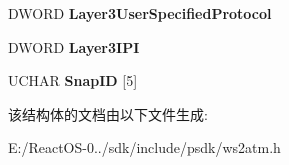 \begin{DoxyCompactItemize}
\item 
\mbox{\label{struct_a_t_m___b_l_l_i___i_e_a04911cc7840803e27967ba03e11c6f47}} 
D\+W\+O\+RD {\bfseries Layer3\+User\+Specified\+Protocol}
\item 
\mbox{\label{struct_a_t_m___b_l_l_i___i_e_ac6a9807b69501b56722a18fd42e3c826}} 
D\+W\+O\+RD {\bfseries Layer3\+I\+PI}
\item 
\mbox{\label{struct_a_t_m___b_l_l_i___i_e_a60e08d8b973f64c0aa95ccc5264eb791}} 
U\+C\+H\+AR {\bfseries Snap\+ID} \mbox{[}5\mbox{]}
\end{DoxyCompactItemize}


该结构体的文档由以下文件生成\+:\begin{DoxyCompactItemize}
\item 
E\+:/\+React\+O\+S-\/0../sdk/include/psdk/ws2atm.\+h\end{DoxyCompactItemize}
